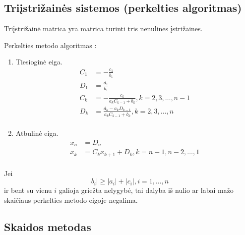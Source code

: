
\subsection{Triįstrižainės sistemos (perkelties algoritmas)}

\cite[72-73]{textbook}


Triįstrižainė matrica yra matrica turinti tris nenulines įstrižaines.


Perkelties metodo algoritmas :
\begin{enumerate}
  \item Tiesioginė eiga.
    \begin{align*}
      C_{1} &= -\frac{c_{1}}{b_{1}} \\
      D_{1} &= \frac{d_{1}}{b_{1}} \\
      C_{k} &= -\frac{c_{k}}{a_{k}C_{k-1}+b_{k}}, k=2,3,\ldots,n-1 \\
      D_{k} &= \frac{d_{k}-a_{k}D_{k-1}}{a_{k}C_{k-1}+b_{k}}, k=2,3,\ldots,n \\
    \end{align*}
  \item Atbulinė eiga.
    \begin{align*}
      x_{n} &= D_{n} \\
      x_{k} &= C_{k}x_{k+1} + D_{k}, k=n-1,n-2,\ldots,1 \\
    \end{align*}
\end{enumerate}

\begin{prop}
  Jei
  \begin{equation*}
    |b_{i}| \geq |a_{i}| + |c_{i}|, i=1,\ldots,n
  \end{equation*}
  ir bent su vienu $i$ galioja griežta nelygybė, tai dalyba iš nulio ar
  labai mažo skaičiaus perkelties metodo eigoje negalima.
\end{prop}


\subsection{Skaidos metodas}

